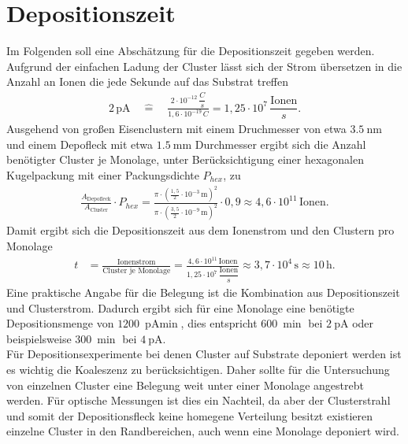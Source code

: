 \section{Depositionszeit}
\label{sec:depo}
Im Folgenden soll eine Abschätzung für die Depositionszeit gegeben werden.
Aufgrund der einfachen Ladung der Cluster lässt sich der Strom übersetzen in die Anzahl an Ionen die jede Sekunde auf das Substrat treffen
\begin{align}
  2\,\text{pA} \quad \widehat{=} \quad \frac{2\cdot10^{-12}\,\dfrac{C}{s}}{1,6\cdot10^{-19}\,C} = 1,25\cdot10^7 \,\dfrac{\text{Ionen}}{s}.
\end{align}
Ausgehend von großen Eisenclustern mit einem Druchmesser von etwa $\SI{3,5}{\nano\meter}$ und einem Depofleck mit etwa $\SI{1,5}{\milli\meter}$ Durchmesser ergibt sich die Anzahl benötigter Cluster je Monolage, unter Berücksichtigung einer hexagonalen Kugelpackung mit einer Packungsdichte $P_{hex}$, zu
\begin{align}
  \frac{A_{\text{Depofleck}}}{A_{\text{Cluster}}}\cdot P_{hex} =\frac{\pi\cdot(\frac{1,5}{2}\cdot10^{-3}\,\text{m})^2}{\pi\cdot(\frac{3,5}{2}\cdot10^{-9}\,\text{m})^2}\cdot 0,9\approx 4,6\cdot10^{11} \,\text{Ionen}.
\end{align}
Damit ergibt sich die Depositionszeit aus dem Ionenstrom und den Clustern pro Monolage
\begin{align}
  t&=\frac{\text{Ionenstrom}}{\text{Cluster je Monolage}}=\frac{4,6\cdot10^{11} \,\text{Ionen}}{1,25\cdot10^7 \,\dfrac{\text{Ionen}}{s}}\approx 3,7 \cdot10^4\,\text{s} \approx 10\,\text{h}.
\end{align}
Eine praktische Angabe für die Belegung ist die Kombination aus Depositionszeit und Clusterstrom.
Dadurch ergibt sich für eine Monolage eine benötigte Depositionsmenge von $\SI{1200}{\pA\min}$, dies entspricht $\SI{600}{\min}$ bei $\SI{2}{\pA}$ oder beispielsweise $\SI{300}{\min}$ bei $\SI{4}{\pA}$.\\

Für Depositionsexperimente bei denen Cluster auf Substrate deponiert werden ist es wichtig die Koaleszenz zu berücksichtigen.
Daher sollte für die Untersuchung von einzelnen Cluster eine Belegung weit unter einer Monolage angestrebt werden.
Für optische Messungen ist dies ein Nachteil, da aber der Clusterstrahl und somit der Depositionsfleck keine homegene Verteilung besitzt existieren einzelne Cluster in den Randbereichen, auch wenn eine Monolage deponiert wird.



